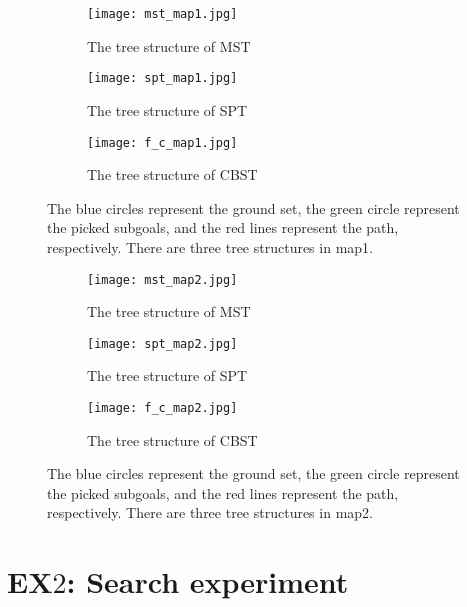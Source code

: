 \begin{figure}[htbp]
 \begin{center}
\begin{subfigure}{.45\textwidth}
  \centering
  \texttt{[image: mst\_map1.jpg]}
  \caption{The tree structure of MST}
\end{subfigure}
\begin{subfigure}{.45\textwidth}
  \centering
  \texttt{[image: spt\_map1.jpg]}
  \caption{The tree structure of SPT}
\end{subfigure}
\begin{subfigure}{.45\textwidth}
  \centering
  \texttt{[image: f\_c\_map1.jpg]}
  \caption{The tree structure of CBST}
\end{subfigure}
\caption{The blue circles represent the ground set, the green circle represent the picked subgoals, and the red lines represent the path, respectively. There are three tree structures in map1.}
\label{fig:TSG_map1}
 \end{center}
 \end{figure}

\begin{figure}[htbp]
 \begin{center}
\begin{subfigure}{.45\textwidth}
  \centering
  \texttt{[image: mst\_map2.jpg]}
  \caption{The tree structure of MST}
\end{subfigure}
\begin{subfigure}{.45\textwidth}
  \centering
  \texttt{[image: spt\_map2.jpg]}
  \caption{The tree structure of SPT}
\end{subfigure}
\begin{subfigure}{.45\textwidth}
  \centering
  \texttt{[image: f\_c\_map2.jpg]}
  \caption{The tree structure of CBST}
\end{subfigure}
\caption{The blue circles represent the ground set, the green circle represent the picked subgoals, and the red lines represent the path, respectively. There are three tree structures in map2.}
\label{fig:TSG_map2}
 \end{center}
 \end{figure}


\section{EX$2$: Search experiment}

